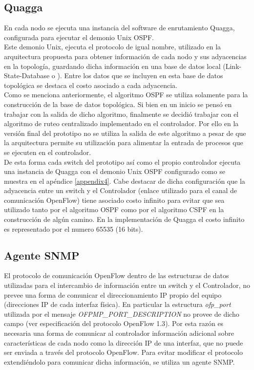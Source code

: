 \subsection{Quagga}
En cada nodo se ejecuta una instancia del software de enrutamiento Quagga, configurada para ejecutar el demonio Unix OSPF.\\ 

Este demonio Unix, ejecuta el protocolo de igual nombre, utilizado en la arquitectura propuesta para obtener información de cada nodo y sus adyacencias en la topolog\'ia, guardando dicha información en una base de datos local (Link-State-Database o ). Entre los datos que se incluyen en esta base de datos topol\'ogica se destaca el costo asociado a cada adyacencia.\\ 

Como se menciona anteriormente, el algoritmo OSPF se utiliza solamente para la construcci\'on de la base de datos topol\'ogica. Si bien en un inicio se pensó en trabajar con la salida de dicho algoritmo, finalmente se decidió trabajar con el algoritmo de ruteo centralizado implementado en el controlador. Por ello en la versi\'on final del prototipo no se utiliza la salida de este algoritmo a pesar de que la arquitectura permite su utilización para alimentar la entrada de procesos que se ejecuten en el controlador.\\

De esta forma cada switch del prototipo así como el propio controlador ejecuta una instancia de Quagga con el demonio Unix OSPF configurado como se muestra en el apéndice \ref{appendix4}. Cabe destacar de dicha configuración que la adyacencia entre un switch y el Controlador (enlace utilizado para el canal de comunicación OpenFlow) tiene asociado costo infinito para evitar que sea utilizado tanto por el algoritmo OSPF como por el algoritmo CSPF en la construcción de algún camino. En la implementaci\'on de Quagga el costo infinito es representado por el numero 65535 (16 bits).

\subsection{Agente SNMP}
El protocolo de comunicación OpenFlow dentro de las estructuras de datos utilizadas para el intercambio de información entre un switch y el Controlador, no prevee una forma de comunicar el direccionamiento IP propio del equipo (direcciones IP de cada interfaz física). En particular la estructura \textit{ofp\_port} utilizada por el mensaje \textit{OFPMP\_PORT\_DESCRIPTION} no provee de dicho campo (ver especificación del protocolo OpenFlow 1.3\citep{ofv133spec}). Por esta razón es necesaria una forma de comunicar al controlador información adicional sobre características de cada nodo como la dirección IP de una interfaz, que no puede ser enviada a través del protocolo OpenFlow. Para evitar modificar el protocolo extendiéndolo para comunicar dicha informaci\'on, se utiliza un agente SNMP.\\


